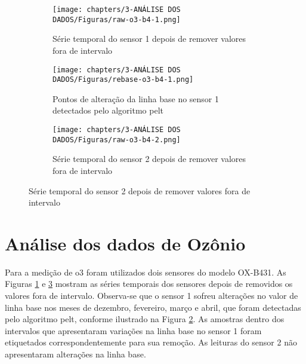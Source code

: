 \begin{figure}[h!]
    \centering
    \caption{Série temporal dos sensores de \acrshort{o3} modelo OX-B431}
    \begin{subfigure}{0.495\textwidth}
        \texttt{[image: chapters/3-ANÁLISE DOS DADOS/Figuras/raw-o3-b4-1.png]}
        \caption{Série temporal do sensor 1 depois de remover valores fora de intervalo}
        \label{fig:data-o3-1-raw}
    \end{subfigure}
    \hfill
    \begin{subfigure}{0.495\textwidth}
        \texttt{[image: chapters/3-ANÁLISE DOS DADOS/Figuras/rebase-o3-b4-1.png]}
        \caption{Pontos de alteração da linha base no sensor 1 detectados pelo algoritmo \acrshort{pelt}}
        \label{fig:data-rebase-o3-1}
    \end{subfigure}
    \hfill
    \begin{subfigure}{0.5\textwidth}
        \texttt{[image: chapters/3-ANÁLISE DOS DADOS/Figuras/raw-o3-b4-2.png]}
        \caption{Série temporal do sensor 2 depois de remover valores fora de intervalo}
        \label{fig:data-o3-2-raw}
    \end{subfigure}
    \label{fig:data-o3-raw-and-pelt}
\end{figure}

\section{Análise dos dados de Ozônio}

Para a medição de \acrshort{o3} foram utilizados dois sensores do modelo OX-B431. As Figuras \ref{fig:data-o3-1-raw} e \ref{fig:data-o3-2-raw} mostram as séries temporais dos sensores depois de removidos os valores fora de intervalo. Observa-se que o sensor 1 sofreu alterações no valor de linha base nos meses de dezembro, fevereiro, março e abril, que foram detectadas pelo algoritmo \acrshort{pelt}, conforme ilustrado na Figura \ref{fig:data-rebase-o3-1}. As amostras dentro dos intervalos que apresentaram variações na linha base no sensor 1 foram etiquetados correspondentemente para sua remoção. As leituras do sensor 2 não apresentaram alterações na linha base.

